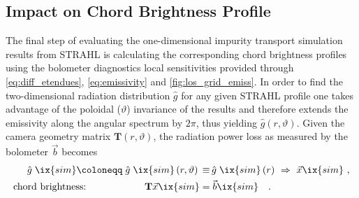         \subsection{Impact on Chord Brightness Profile}\label{subsec:strahlchord}%
%
            The final step of evaluating the one-dimensional impurity transport simulation results from STRAHL is calculating the corresponding chord brightness profiles using the bolometer diagnostics local sensitivities provided through \cref{eq:diff_etendues}, \ref{eq:emissivity} and \cref{fig:los_grid_emiss}. In order to find the two-dimensional radiation distribution $\mathrel{\hat{g}}$ for any given STRAHL profile one takes advantage of the poloidal ($\vartheta$) invariance of the results and therefore extends the emissivity along the angular spectrum by  $2\pi$, thus yielding $\mathrel{\hat{g}}\left(r,\vartheta\right)$. Given the camera geometry matrix $\mathbf{T}\left(r,\vartheta\right)$, the radiation power loss as measured by the bolometer $\vec{b}$ becomes%
%
            \begin{align}%
                \begin{split}\label{eq:forward_lint}%
                    \mathrel{\hat{g}}\ix{sim}\coloneqq\mathrel{\hat{g}}\ix{sim}\left(r,\vartheta\right)\,&\equiv\,\mathrel{\hat{g}}\ix{sim}\left(r\right)\,\,\Rightarrow\,\,\vec{x}\ix{sim}\,\,,\\%
                    \text{chord brightness:}\qquad\qquad\qquad\mathbf{T}\vec{x}\ix{sim}&=\vec{b}\ix{sim}\quad.%
                \end{split}%
            \end{align}%
%
            \begin{figure}[t]%
                \centering%
                \begin{minipage}[b]{0.48\textwidth}%
                    \centering%
                \end{minipage}%
                \hfill%
                \begin{minipage}[b]{0.48\textwidth}%
                    \centering%
                \end{minipage}%
                \label{fig:chord_forward_exp_vs_STRAHL}%
            \end{figure}%
